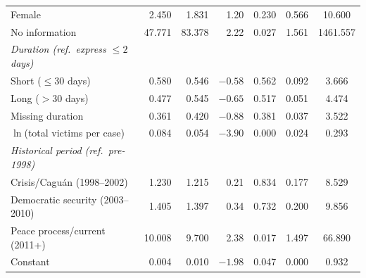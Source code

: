 {\begin{longtable}{@{}l r r r r c c@{}}
Female & 2.450 & 1.831 & 1.20 & 0.230 & 0.566 & 10.600 \\
No information & 47.771 & 83.378 & 2.22 & 0.027 & 1.561 & 1461.557 \\
\addlinespace
\textit{Duration (ref.\ express $\le 2$ days)} & & & & & & \\
Short ($\le 30$ days) & 0.580 & 0.546 & $-0.58$ & 0.562 & 0.092 & 3.666 \\
Long ($>30$ days) & 0.477 & 0.545 & $-0.65$ & 0.517 & 0.051 & 4.474 \\
Missing duration & 0.361 & 0.420 & $-0.88$ & 0.381 & 0.037 & 3.522 \\
\addlinespace
$\ln$(total victims per case) & 0.084 & 0.054 & $-3.90$ & 0.000 & 0.024 & 0.293 \\
\addlinespace
\textit{Historical period (ref.\ pre-1998)} & & & & & & \\
Crisis/Cagu\'an (1998--2002) & 1.230 & 1.215 & 0.21 & 0.834 & 0.177 & 8.529 \\
Democratic security (2003--2010) & 1.405 & 1.397 & 0.34 & 0.732 & 0.200 & 9.856 \\
Peace process/current (2011+) & 10.008 & 9.700 & 2.38 & 0.017 & 1.497 & 66.890 \\
\addlinespace
Constant & 0.004 & 0.010 & $-1.98$ & 0.047 & 0.000 & 0.932 \\
\midrule


\end{longtable}}
